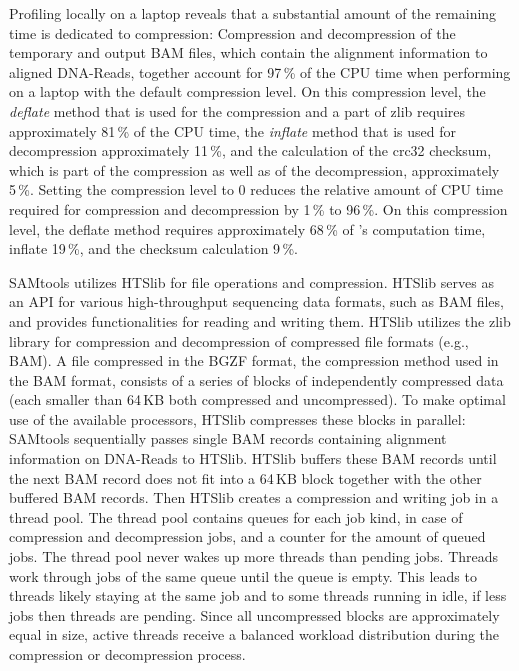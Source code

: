 Profiling \sort locally on a laptop reveals that a substantial amount of the remaining time is dedicated to compression:
Compression and decompression of the temporary and output BAM files, which contain the alignment information to aligned DNA-Reads, together account for 97\,\% of the CPU time when performing \sort on a laptop with the default compression level. On this compression level, the \textit{deflate} method that is used for the compression and a part of zlib requires approximately 81\,\% of the CPU time, the \textit{inflate} method that is used for decompression approximately 11\,\%, and the calculation of the crc32 checksum, which is part of the compression as well as of the decompression, approximately 5\,\%. Setting the compression level to 0 reduces the relative amount of CPU time required for compression and decompression by 1\,\% to 96\,\%. On this compression level, the deflate method requires approximately 68\,\% of \sort's computation time, inflate 19\,\%, and the checksum calculation 9\,\%.

SAMtools utilizes HTSlib for file operations and compression. HTSlib serves as an API for various high-throughput sequencing data formats, such as BAM files, and  provides functionalities for reading and writing them. HTSlib utilizes the zlib library for compression and decompression of compressed file formats (e.g., BAM). A file compressed in the BGZF format, the compression method used in the BAM format, consists of a series of blocks of independently compressed data (each smaller than 64\,KB both compressed and uncompressed). To make optimal use of the available processors, HTSlib compresses these blocks in parallel: SAMtools sequentially passes single BAM records containing alignment information on DNA-Reads to HTSlib. HTSlib buffers these BAM records until the next BAM record does not fit into a 64\,KB block together with the other buffered BAM records. Then HTSlib creates a compression and writing job in a thread pool. The thread pool contains queues for each job kind, in case of \sort compression and decompression jobs, and a counter for the amount of queued jobs. The thread pool never wakes up more threads than pending jobs. Threads work through jobs of the same queue until the queue is empty. This leads to threads likely staying at the same job and to some threads running in idle, if less jobs then threads are pending. Since all uncompressed blocks are approximately equal in size, active threads receive a balanced workload distribution during the compression or decompression process.


